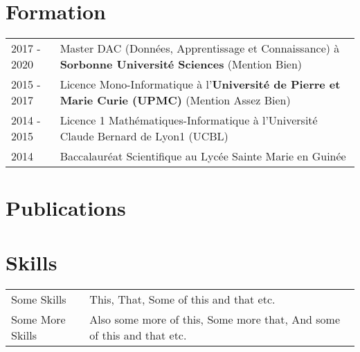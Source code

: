 \documentclass[a4paper,12pt]{article}
\begin{document}
\section{Formation}
\begin{tabularx}{\linewidth}{@{}l X@{}}	
2017 - 2020 & Master DAC (Données, Apprentissage et Connaissance) à \textbf{Sorbonne Université Sciences} \hfill \normalsize (Mention Bien) \\

2015 - 2017 & Licence Mono-Informatique à l'\textbf{Université de Pierre et Marie Curie (UPMC)} \hfill (Mention Assez Bien) \\ 

2014 - 2015 & Licence 1 Mathématiques-Informatique à l'Université Claude Bernard de Lyon1 (UCBL)\\

2014 & Baccalauréat Scientifique au Lycée Sainte Marie en Guinée \\
\end{tabularx}

\section{Publications}
\begin{refsection}
\nocite{*}
\printbibliography[heading=none]
\end{refsection}

\section{Skills}
\begin{tabularx}{\linewidth}{@{}l X@{}}
Some Skills &  \normalsize{This, That, Some of this and that etc.}\\
Some More Skills  &  \normalsize{Also some more of this, Some more that, And some of this and that etc.}\\  
\end{tabularx}

\vfill
{}
\end{document}
